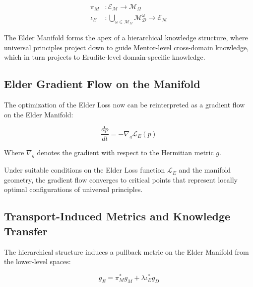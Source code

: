 \begin{equation}
\begin{aligned}
\pi_M &: \mathcal{E}_{\mathcal{M}} \rightarrow \mathcal{M}_{\Omega} \\
\iota_E &: \bigcup_{\omega \in \mathcal{M}_{\Omega}} \mathcal{M}_{\mathcal{D}}^{\omega} \rightarrow \mathcal{E}_{\mathcal{M}}
\end{aligned}
\end{equation}

\begin{theorem}
The Elder Manifold forms the apex of a hierarchical knowledge structure, where universal principles project down to guide Mentor-level cross-domain knowledge, which in turn projects to Erudite-level domain-specific knowledge.
\end{theorem}

\subsection{Elder Gradient Flow on the Manifold}

The optimization of the Elder Loss now can be reinterpreted as a gradient flow on the Elder Manifold:

\begin{equation}
\frac{dp}{dt} = -\nabla_g \mathcal{L}_E(p)
\end{equation}

Where $\nabla_g$ denotes the gradient with respect to the Hermitian metric $g$.

\begin{proposition}
Under suitable conditions on the Elder Loss function $\mathcal{L}_E$ and the manifold geometry, the gradient flow converges to critical points that represent locally optimal configurations of universal principles.
\end{proposition}

\subsection{Transport-Induced Metrics and Knowledge Transfer}

The hierarchical structure induces a pullback metric on the Elder Manifold from the lower-level spaces:

\begin{equation}
g_E = \pi_M^* g_M + \lambda \iota_E^* g_D
\end{equation}

